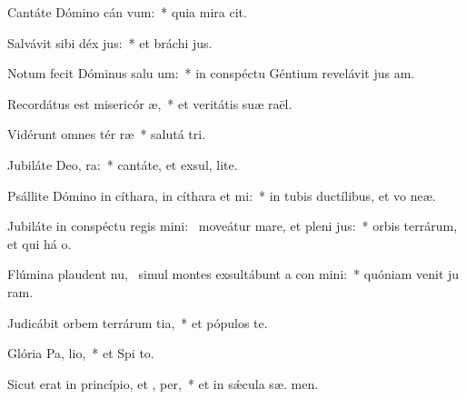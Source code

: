 \item Cantáte Dómino cán vum:~* quia mira cit.
\item Salvávit sibi déx jus:~* et bráchi  jus.
\item Notum fecit Dóminus salu um:~* in conspéctu Géntium revelávit jus am.
\item Recordátus est misericór æ,~* et veritátis suæ  raël.
\item Vidérunt omnes tér ræ~* salutá  tri.
\item Jubiláte Deo,  ra:~* cantáte, et exsul,  lite.
\item Psállite Dómino in cíthara, in cíthara et  mi:~* in tubis ductílibus, et vo  neæ.
\item Jubiláte in conspéctu regis mini:~\pscross{} moveátur mare, et pleni jus:~* orbis terrárum, et qui há  o.
\item Flúmina plaudent nu,~\pscross{} simul montes exsultábunt a con mini:~* quóniam venit ju ram.
\item Judicábit orbem terrárum  tia,~* et pópulos  te.
\item Glória Pa,  lio,~* et Spi to.
\item Sicut erat in princípio, et ,  per,~* et in sǽcula sæ. men.
